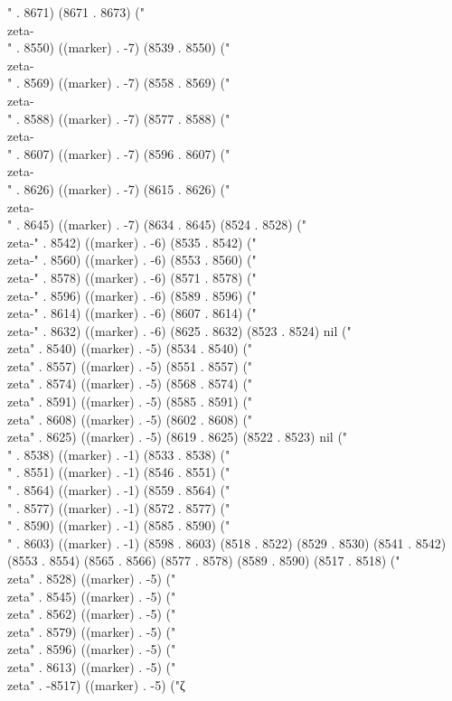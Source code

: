 {{" . 8671) (8671 . 8673) ("\\zeta-\\" . 8550) ((marker) . -7) (8539 . 8550) ("\\zeta-\\" . 8569) ((marker) . -7) (8558 . 8569) ("\\zeta-\\" . 8588) ((marker) . -7) (8577 . 8588) ("\\zeta-\\" . 8607) ((marker) . -7) (8596 . 8607) ("\\zeta-\\" . 8626) ((marker) . -7) (8615 . 8626) ("\\zeta-\\" . 8645) ((marker) . -7) (8634 . 8645) (8524 . 8528) ("\\zeta-" . 8542) ((marker) . -6) (8535 . 8542) ("\\zeta-" . 8560) ((marker) . -6) (8553 . 8560) ("\\zeta-" . 8578) ((marker) . -6) (8571 . 8578) ("\\zeta-" . 8596) ((marker) . -6) (8589 . 8596) ("\\zeta-" . 8614) ((marker) . -6) (8607 . 8614) ("\\zeta-" . 8632) ((marker) . -6) (8625 . 8632) (8523 . 8524) nil ("\\zeta" . 8540) ((marker) . -5) (8534 . 8540) ("\\zeta" . 8557) ((marker) . -5) (8551 . 8557) ("\\zeta" . 8574) ((marker) . -5) (8568 . 8574) ("\\zeta" . 8591) ((marker) . -5) (8585 . 8591) ("\\zeta" . 8608) ((marker) . -5) (8602 . 8608) ("\\zeta" . 8625) ((marker) . -5) (8619 . 8625) (8522 . 8523) nil ("\\" . 8538) ((marker) . -1) (8533 . 8538) ("\\" . 8551) ((marker) . -1) (8546 . 8551) ("\\" . 8564) ((marker) . -1) (8559 . 8564) ("\\" . 8577) ((marker) . -1) (8572 . 8577) ("\\" . 8590) ((marker) . -1) (8585 . 8590) ("\\" . 8603) ((marker) . -1) (8598 . 8603) (8518 . 8522) (8529 . 8530) (8541 . 8542) (8553 . 8554) (8565 . 8566) (8577 . 8578) (8589 . 8590) (8517 . 8518) ("\\zeta" . 8528) ((marker) . -5) ("\\zeta" . 8545) ((marker) . -5) ("\\zeta" . 8562) ((marker) . -5) ("\\zeta" . 8579) ((marker) . -5) ("\\zeta" . 8596) ((marker) . -5) ("\\zeta" . 8613) ((marker) . -5) ("\\zeta" . -8517) ((marker) . -5) ("ζ
}}
